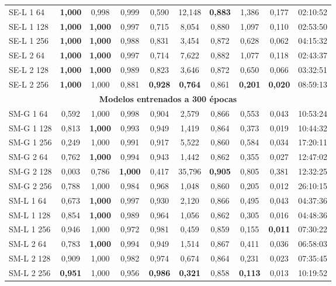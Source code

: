 \begin{longtable}{lccccccccc}
SE-L 1 64 & \textbf{1,000} & 0,998 & 0,999 & 0,590 & 12,148 & \textbf{0,883} & 1,386 & 0,177 & 02:10:52\\
SE-L 1 128 & \textbf{1,000} & \textbf{1,000} & 0,997 & 0,715 & 8,054 & 0,880 & 1,097 & 0,110 & 02:53:50\\
SE-L 1 256 & \textbf{1,000} & \textbf{1,000} & 0,988 & 0,831 & 3,454 & 0,872 & 0,628 & 0,062 & 04:15:32\\
SE-L 2 64 & \textbf{1,000} & \textbf{1,000} & 0,997 & 0,714 & 7,622 & 0,882 & 1,077 & 0,118 & 02:43:37\\
SE-L 2 128 & \textbf{1,000} & \textbf{1,000} & 0,989 & 0,823 & 3,646 & 0,872 & 0,650 & 0,066 & 03:32:51\\
SE-L 2 256 & \textbf{1,000} & 1,000 & 0,881 & \textbf{0,928} & \textbf{0,764} & 0,861 & \textbf{0,201} & \textbf{0,020} & 08:59:13\\
\midrule
\multicolumn{10}{c}{\textbf{Modelos entrenados a 300 épocas}} \\
\midrule
SM-G 1 64 & 0,592 & 1,000 & 0,998 & 0,904 & 2,579 & 0,866 & 0,553 & 0,043 & 10:53:24\\
SM-G 1 128 & 0,813 & \textbf{1,000} & 0,993 & 0,949 & 1,419 & 0,864 & 0,373 & 0,019 & 10:44:32\\
SM-G 1 256 & 0,249 & 1,000 & 0,991 & 0,917 & 5,522 & 0,860 & 0,584 & 0,034 & 17:20:11\\
SM-G 2 64 & 0,762 & \textbf{1,000} & 0,994 & 0,943 & 1,442 & 0,862 & 0,355 & 0,027 & 12:47:02\\
SM-G 2 128 & 0,003 & 0,786 & \textbf{1,000} & 0,417 & 35,796 & \textbf{0,905} & 0,805 & 0,381 & 12:32:25\\
SM-G 2 256 & 0,788 & 1,000 & 0,984 & 0,968 & 1,048 & 0,860 & 0,205 & 0,012 & 26:10:15\\
SM-L 1 64 & 0,673 & \textbf{1,000} & 0,997 & 0,930 & 2,120 & 0,866 & 0,495 & 0,043 & 04:37:36\\
SM-L 1 128 & 0,854 & \textbf{1,000} & 0,989 & 0,964 & 1,056 & 0,862 & 0,305 & 0,016 & 04:48:36\\
SM-L 1 256 & 0,946 & 1,000 & 0,972 & 0,981 & 0,459 & 0,859 & 0,155 & \textbf{0,011} & 07:30:22\\
SM-L 2 64 & 0,783 & \textbf{1,000} & 0,994 & 0,949 & 1,514 & 0,867 & 0,411 & 0,036 & 06:58:03\\
SM-L 2 128 & 0,909 & 1,000 & 0,982 & 0,974 & 0,674 & 0,864 & 0,231 & 0,023 & 07:35:45\\
SM-L 2 256 & \textbf{0,951} & 1,000 & 0,956 & \textbf{0,986} & \textbf{0,321} & 0,858 & \textbf{0,113} & 0,013 & 10:19:52\\

\end{longtable}
